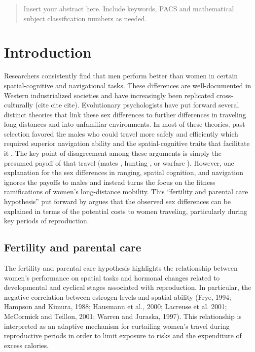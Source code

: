\date{Received: date / Accepted: date}


\maketitle

\begin{abstract}
Insert your abstract here. Include keywords, PACS and mathematical
subject classification numbers as needed.
\end{abstract}

\section{Introduction}
\label{sec:1}
Researchers consistently find  that men perform better than women in certain spatial-cognitive and navigational tasks.  These differences are well-documented in Western industrialized societies and have increasingly been replicated cross-culturally (cite cite cite).  Evolutionary psychologists have put forward several distinct theories that link these sex differences to further differences in traveling long distances and into unfamiliar environments.  In most of these theories, past selection favored the males who could travel more safely and efficiently which required superior navigation ability and the spatial-cognitive traits that facilitate it \cite{gray1971sex}.  The key point of disagreement among these arguments is simply the presumed payoff of that travel (mates \cite{gaulin1992evolution}, hunting \cite{eals1994hunter}, or warfare \cite{geary1995sexual}).  However, one explanation for the sex differences in ranging, spatial cognition, and navigation ignores the payoffs to males and instead turns the focus on the fitness ramifications of women's long-distance mobility.  This ``fertility and parental care hypothesis'' put forward by \cite{sherry1997evolution} argues that the observed sex differences can be explained in terms of the potential costs to women traveling, particularly during key periods of reproduction.

	\subsection{Fertility and parental care}
	\label{sec:1.1}
The fertility and parental care hypothesis highlights the relationship between women's performance on spatial tasks and hormonal changes related to developmental and cyclical stages associated with reproduction.  In particular, the negative correlation between estrogen levels and spatial ability (Frye, 1994; Hampson and Kimura, 1988; Hausmann et al., 2000; Lacreuse et al. 2001; McCormick and Teillon, 2001; Warren and Juraska, 1997).  This relationship is interpreted as an adaptive mechanism for curtailing women's travel during reproductive periods in order to limit exposure to risks and the expenditure of excess calories.
	
